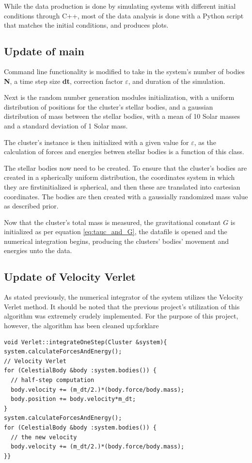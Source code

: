 \documentclass[11pt,a4paper,notitlepage,twocolumn]{article}
\begin{document}
While the data production is done by simulating systems with different initial conditions through C++, most of the data analysis is done with a Python script that matches the initial conditions, and produces plots.

\subsection{Update of main}
Command line functionality is modified to take in the system's number of bodies \textbf{N}, a time step size \textbf{dt}, correction factor $\varepsilon$, and duration of the simulation.

Next is the random number generation modules initialization, with a uniform distribution of positions for the cluster's stellar bodies, and a gaussian distribution of mass between the stellar bodies, with a mean of 10 Solar masses and a standard deviation of 1 Solar mass.

The cluster's instance is then initialized with a given value for $\varepsilon$, as the calculation of forces and energies betwen stellar bodies is a function of this class.

The stellar bodies now need to be created. To ensure that the cluster's bodies are created in a spherically uniform distribution, the coordinates system in which they are firstinitialized is spherical, and then these are translated into cartesian coordinates. The bodies are then created with a gaussially randomized mass value as described prior.

Now that the cluster's total mass is measured, the gravitational constant $G$ is initialized as per equation \ref{eq:tauc_and_G}, the datafile is opened and the numerical integration begins, producing the clusters' bodies' movement and energies unto the data.

\subsection{Update of Velocity Verlet}
As stated previously, the numerical integrator of the system utilizes the Velocity Verlet method. It should be noted that the previous project's utilization of this algorithm was extremely crudely implemented. For the purpose of this project, however, the algorithm has been cleaned up:forklare
\lstset{style=c++style}
\begin{lstlisting}
void Verlet::integrateOneStep(Cluster &system){
system.calculateForcesAndEnergy();
// Velocity Verlet
for (CelestialBody &body :system.bodies()) {
  // half-step computation
  body.velocity += (m_dt/2.)*(body.force/body.mass);
  body.position += body.velocity*m_dt;
}
system.calculateForcesAndEnergy();
for (CelestialBody &body :system.bodies()) {
  // the new velocity
  body.velocity += (m_dt/2.)*(body.force/body.mass);
}}
\end{lstlisting}
\end{document}
